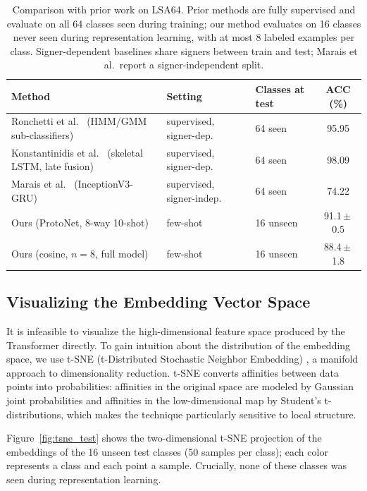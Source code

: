 \documentclass{article}
\begin{document}
\begin{table}[h!]
\centering
\small
\begin{tabular}{lllc}
\toprule
\textbf{Method} & \textbf{Setting} & \textbf{Classes at test} & \textbf{ACC (\%)} \\
\midrule
Ronchetti et al.\ \cite{Ronchetti2016} (HMM/GMM sub-classifiers) & supervised, signer-dep. & 64 seen & 95.95 \\
Konstantinidis et al.\ \cite{konstantinidis2018sign} (skeletal LSTM, late fusion) & supervised, signer-dep. & 64 seen & 98.09 \\
Marais et al.\ \cite{marais2022investigating} (InceptionV3-GRU) & supervised, signer-indep. & 64 seen & 74.22 \\
\midrule
Ours (ProtoNet, 8-way 10-shot) & few-shot & 16 unseen & 91.1\,$\pm$\,0.5 \\
Ours (cosine, $n=8$, full model) & few-shot & 16 unseen & 88.4\,$\pm$\,1.8 \\
\bottomrule
\end{tabular}
\caption{Comparison with prior work on LSA64. Prior methods are fully supervised and evaluate on all 64 classes seen during training; our method evaluates on 16 classes never seen during representation learning, with at most 8 labeled examples per class. Signer-dependent baselines share signers between train and test; Marais et al.\ report a signer-independent split.}
\label{tab:sota}
\end{table}

\subsection{Visualizing the Embedding Vector Space}
It is infeasible to visualize the high-dimensional feature space produced by the Transformer directly. To gain intuition about the distribution of the embedding space, we use t-SNE (t-Distributed Stochastic Neighbor Embedding) \cite{van2008visualizing}, a manifold approach to dimensionality reduction. t-SNE converts affinities between data points into probabilities: affinities in the original space are modeled by Gaussian joint probabilities and affinities in the low-dimensional map by Student's t-distributions, which makes the technique particularly sensitive to local structure.

Figure~\ref{fig:tsne_test} shows the two-dimensional t-SNE projection of the embeddings of the 16 unseen test classes (50 samples per class); each color represents a class and each point a sample. Crucially, none of these classes was seen during representation learning.
\end{document}
